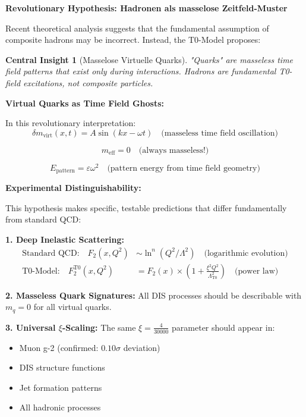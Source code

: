 \documentclass[12pt,a4paper]{report}
\newtheorem{insight}{Central Insight}[chapter]
\begin{document}
\textbf{Revolutionary Hypothesis: Hadronen als masselose Zeitfeld-Muster}

Recent theoretical analysis suggests that the fundamental assumption of composite hadrons may be incorrect. Instead, the T0-Model proposes:

\begin{insight}[Masselose Virtuelle Quarks]
	"Quarks" are masseless time field patterns that exist only during interactions. Hadrons are fundamental T0-field excitations, not composite particles.
\end{insight}

\textbf{Virtual Quarks as Time Field Ghosts:}

In this revolutionary interpretation:
\begin{equation}
	\delta m_{\text{virt}}(x,t) = A \sin(kx - \omega t) \quad \text{(masseless time field oscillation)}
\end{equation}

\begin{equation}
	m_{\text{eff}} = 0 \quad \text{(always masseless!)}
\end{equation}

\begin{equation}
	E_{\text{pattern}} = \varepsilon \omega^2 \quad \text{(pattern energy from time field geometry)}
\end{equation}

\textbf{Experimental Distinguishability:}

This hypothesis makes specific, testable predictions that differ fundamentally from standard QCD:

\textbf{1. Deep Inelastic Scattering:}
\begin{align}
	\text{Standard QCD:} \quad F_2(x,Q^2) &\sim \ln^n(Q^2/\Lambda^2) \quad \text{(logarithmic evolution)} \\
	\text{T0-Model:} \quad F_2^{\text{T0}}(x,Q^2) &= F_2(x) \times \left(1 + \frac{\xi^2 Q^2}{\Lambda_{\text{T0}}^2}\right) \quad \text{(power law)}
\end{align}

\textbf{2. Masseless Quark Signatures:}
All DIS processes should be describable with $m_q = 0$ for all virtual quarks.

\textbf{3. Universal $\xi$-Scaling:}
The same $\xi = \frac{4}{30000}$ parameter should appear in:
\begin{itemize}
	\item Muon g-2 (confirmed: $0.10\sigma$ deviation)
	\item DIS structure functions
	\item Jet formation patterns
	\item All hadronic processes
\end{itemize}
\end{document}
